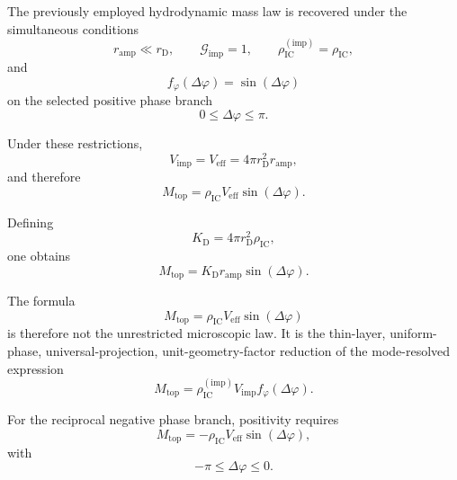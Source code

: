 The previously employed hydrodynamic mass law is recovered under the simultaneous conditions
\begin{equation}
    r_{\mathrm{amp}} \ll r_{\mathrm{D}}, \qquad \mathcal{G}_{\mathrm{imp}} = 1, \qquad \rho_{\mathrm{IC}}^{(\mathrm{imp})} = \rho_{\mathrm{IC}},
\end{equation}
and
\begin{equation}
    f_{\varphi}(\Delta\varphi) = \sin(\Delta\varphi)
\end{equation}
on the selected positive phase branch
\begin{equation}
    0 \leq \Delta\varphi \leq \pi.
\end{equation}

Under these restrictions,
\begin{equation}
    V_{\mathrm{imp}} = V_{\mathrm{eff}} = 4\pi r_{\mathrm{D}}^2r_{\mathrm{amp}},
\end{equation}
and therefore
\begin{equation}
    M_{\mathrm{top}} = \rho_{\mathrm{IC}} V_{\mathrm{eff}} \sin(\Delta\varphi).
\end{equation}

Defining
\begin{equation}
    K_{\mathrm{D}} = 4\pi r_{\mathrm{D}}^2\rho_{\mathrm{IC}},
\end{equation}
one obtains
\begin{equation}
    M_{\mathrm{top}} = K_{\mathrm{D}} r_{\mathrm{amp}} \sin(\Delta\varphi).
\end{equation}

The formula
\begin{equation}
    M_{\mathrm{top}} = \rho_{\mathrm{IC}} V_{\mathrm{eff}} \sin(\Delta\varphi)
\end{equation}
is therefore not the unrestricted microscopic law. It is the thin-layer, uniform-phase, universal-projection, unit-geometry-factor reduction of the mode-resolved expression
\begin{equation}
    M_{\mathrm{top}} = \rho_{\mathrm{IC}}^{(\mathrm{imp})} V_{\mathrm{imp}} f_{\varphi}(\Delta\varphi).
\end{equation}

For the reciprocal negative phase branch, positivity requires
\begin{equation}
    M_{\mathrm{top}} = -\rho_{\mathrm{IC}} V_{\mathrm{eff}} \sin(\Delta\varphi),
\end{equation}
with
\begin{equation}
    -\pi \leq \Delta\varphi \leq 0.
\end{equation}

